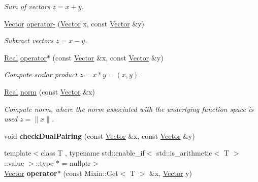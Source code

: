 \begin{DoxyCompactItemize}
\begin{DoxyCompactList}\small\item\em Sum of vectors $z=x+y$. \end{DoxyCompactList}\item 
\hypertarget{namespaceSpacy_a9eaf4be1a4e8f3ee03e4c4fdafa5687d}{\hyperlink{classSpacy_1_1Vector}{Vector} \hyperlink{namespaceSpacy_a9eaf4be1a4e8f3ee03e4c4fdafa5687d}{operator-\/} (\hyperlink{classSpacy_1_1Vector}{Vector} x, const \hyperlink{classSpacy_1_1Vector}{Vector} \&y)}\label{namespaceSpacy_a9eaf4be1a4e8f3ee03e4c4fdafa5687d}

\begin{DoxyCompactList}\small\item\em Subtract vectors $z=x-y$. \end{DoxyCompactList}\item 
\hypertarget{namespaceSpacy_a1d84603fc2bfbefca6a020b1217519ad}{\hyperlink{classSpacy_1_1Real}{Real} \hyperlink{namespaceSpacy_a1d84603fc2bfbefca6a020b1217519ad}{operator$\ast$} (const \hyperlink{classSpacy_1_1Vector}{Vector} \&x, const \hyperlink{classSpacy_1_1Vector}{Vector} \&y)}\label{namespaceSpacy_a1d84603fc2bfbefca6a020b1217519ad}

\begin{DoxyCompactList}\small\item\em Compute scalar product $z=x*y=(x,y)$. \end{DoxyCompactList}\item 
\hyperlink{classSpacy_1_1Real}{Real} \hyperlink{namespaceSpacy_a86a4fc266aa19a07b0af16388907354b}{norm} (const \hyperlink{classSpacy_1_1Vector}{Vector} \&x)
\begin{DoxyCompactList}\small\item\em Compute norm, where the norm associated with the underlying function space is used $ z = \|x\| $. \end{DoxyCompactList}\item 
\hypertarget{namespaceSpacy_ac354f06d21282619482e3ef4a841cd76}{void {\bfseries check\-Dual\-Pairing} (const \hyperlink{classSpacy_1_1Vector}{Vector} \&x, const \hyperlink{classSpacy_1_1Vector}{Vector} \&y)}\label{namespaceSpacy_ac354f06d21282619482e3ef4a841cd76}

\item 
\hypertarget{namespaceSpacy_a0e5e7a61e6d2996df2b3e86371d38dfa}{{\footnotesize template$<$class T , typename std\-::enable\-\_\-if$<$ std\-::is\-\_\-arithmetic$<$ T $>$\-::value $>$\-::type $\ast$  = nullptr$>$ }\\\hyperlink{classSpacy_1_1Vector}{Vector} {\bfseries operator$\ast$} (const Mixin\-::\-Get$<$ T $>$ \&x, \hyperlink{classSpacy_1_1Vector}{Vector} y)}\label{namespaceSpacy_a0e5e7a61e6d2996df2b3e86371d38dfa}


\end{DoxyCompactItemize}

